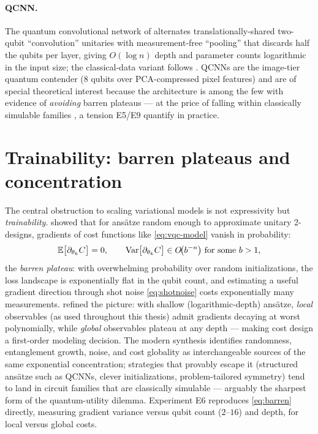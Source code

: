 \paragraph{QCNN.} The quantum convolutional network of \citet{cong2019qcnn}
alternates translationally-shared two-qubit ``convolution'' unitaries with
measurement-free ``pooling'' that discards half the qubits per layer, giving
$O(\log n)$ depth and parameter counts logarithmic in the input size; the
classical-data variant follows \citet{hur2022qcnn}. QCNNs are the image-tier
quantum contender (8 qubits over PCA-compressed pixel features) and are of
special theoretical interest because the architecture is among the few with
evidence of \emph{avoiding} barren plateaus \citep{larocca2025barren} --- at
the price of falling within classically simulable families
\citep{cerezo2023simulability}, a tension E5/E9 quantify in practice.

\section{Trainability: barren plateaus and concentration}
\label{sec:qml-trainability}

The central obstruction to scaling variational models is not expressivity but
\emph{trainability}. \citet{mcclean2018barren} showed that for ansätze random
enough to approximate unitary 2-designs, gradients of cost functions like
\eqref{eq:vqc-model} vanish in probability:
\begin{equation}
  \mathbb{E}\bigl[ \partial_{\theta_k} C \bigr] = 0,
  \qquad
  \mathrm{Var}\bigl[ \partial_{\theta_k} C \bigr] \in O\!\bigl( b^{-n} \bigr)
  \text{ for some } b > 1,
  \label{eq:barren}
\end{equation}
the \emph{barren plateau}: with overwhelming probability over random
initializations, the loss landscape is exponentially flat in the qubit count,
and estimating a useful gradient direction through shot noise
\eqref{eq:shotnoise} costs exponentially many measurements.
\citet{cerezo2021costfunction} refined the picture: with shallow
(logarithmic-depth) ansätze, \emph{local} observables (as used throughout this
thesis) admit gradients decaying at worst polynomially, while \emph{global}
observables plateau at any depth --- making cost design a first-order modeling
decision. The modern synthesis \citep{larocca2025barren} identifies
randomness, entanglement growth, noise, and cost globality as interchangeable
sources of the same exponential concentration; strategies that provably escape
it (structured ansätze such as QCNNs, clever initializations, problem-tailored
symmetry) tend to land in circuit families that are classically simulable
\citep{cerezo2023simulability} --- arguably the sharpest form of the
quantum-utility dilemma. Experiment E6 reproduces \eqref{eq:barren} directly,
measuring gradient variance versus qubit count ($2$--$16$) and depth, for
local versus global costs.

